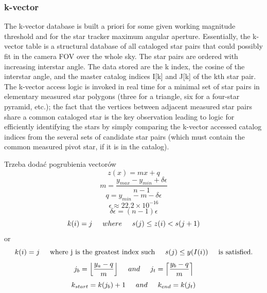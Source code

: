 \documentclass[12pt,a4paper,oneside]{article}
\begin{document}
\subsubsection{k-vector}
The k-vector database is built a priori for some given working
magnitude threshold and for the star tracker maximum angular aperture. Essentially, the
k-vector table is a structural database of all cataloged star pairs that could possibly fit in the
camera FOV over the whole sky. The star pairs are ordered with increasing interstar angle.
The data stored are the k index, the cosine of the interstar angle, and the master catalog
indices I[k] and J[k] of the kth star pair. The k-vector access logic is invoked in real time
for a minimal set of star pairs in elementary measured star polygons (three for a triangle,
six for a four-star pyramid, etc.); the fact that the vertices between adjacent measured star
pairs share a common cataloged star is the key observation leading to logic for efficiently
identifying the stars by simply comparing the k-vector accessed catalog indices from the
several sets of candidate star pairs (which must contain the common measured pivot star, if
it is in the catalog).
\cite{mortari2013k}\par
\cite{mortari1996fast}\par
\cite{mortari2000k}\par
Trzeba dodać pogrubienia vectorów
\begin{equation}
z(x) = mx + q
\end{equation}
\begin{equation}
m = \frac{y_{max} - y_{min} + \delta\epsilon}{n - 1}
\end{equation}
\begin{equation}
q = y_{min} - m - \delta\epsilon
\end{equation}
\begin{equation}
\epsilon \approx 22.2 \times 10^{-16}
\end{equation}
\begin{equation}
\delta\epsilon = (n - 1)\epsilon
\end{equation}
\begin{equation}
k(i) = j \hspace{0.5cm} where \hspace{0.5cm} s(j) \leq z(i) < s(j + 1)
\end{equation}
or
\begin{equation}
k(i) = j \hspace{0.5cm} \textnormal{where j is the greatest index such} \hspace{0.5cm} s(j) \leq y(I(i)) \hspace{0.5cm} \textnormal{is satisfied.}
\end{equation}
\begin{equation}
j_b = \Big\lfloor\frac{y_a - q}{m}\Big\rfloor \hspace{0.5cm} and \hspace{0.5cm} j_t = \Big\lceil\frac{y_b - q}{m}\Big\rceil
\end{equation}
\begin{equation}
k_{start} = k(j_b) + 1 \hspace{0.5cm} and \hspace{0.5cm} k_{end} = k(j_t)
\end{equation}
\end{document}
